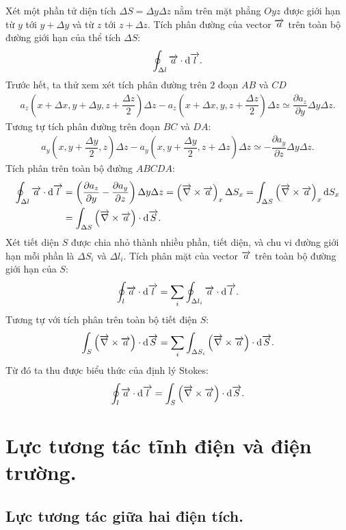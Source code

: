 \begin{appendices}
\begin{center}
\end{center}
Xét một phần tử diện tích $\Delta S= \Delta y \Delta z$ nằm trên mặt phẳng $Oyz$ được giới hạn từ $y$ tới $y+\Delta y$ và từ $z$ tới $z+\Delta z$. Tích phân đường của vector $\overrightarrow{a}$ trên toàn bộ đường giới hạn của thể tích $\Delta S$:
$$\oint_{\Delta l} \overrightarrow{a}\cdot\mathrm{d}\overrightarrow{l}.$$
Trước hết, ta thử xem xét tích phân đường trên $2$ đoạn  $AB$ và $CD$
\begin{align*}
	  a_z\left(x+\Delta x,y+\Delta y,z+\dfrac{\Delta z}{2}\right)\Delta z-a_z\left(x+\Delta x,y,z+\dfrac{\Delta z}{2}\right)\Delta z\simeq \dfrac{\partial a_z}{\partial y}\Delta y\Delta z.
\end{align*}
Tương tự tích phân đường trên đoạn $BC$ và $DA$:
\begin{align*}
	a_y\left(x,y+\dfrac{\Delta y}{2},z\right)\Delta z-a_y\left(x,y+\dfrac{\Delta y}{2},z+\Delta z\right)\Delta z\simeq -\dfrac{\partial a_y}{\partial z}\Delta y\Delta z.
\end{align*}
Tích phân trên toàn bộ đường $ABCDA$:
\begin{align*}
	\oint_{\Delta l} \overrightarrow{a}\cdot\mathrm{d}\overrightarrow{l}&=\left(\dfrac{\partial a_z}{\partial y}-\dfrac{\partial a_y}{\partial z}\right)\Delta y\Delta z=\left(\overrightarrow{\nabla}\times\overrightarrow{a}\right)_x\Delta S_x=\int_{\Delta S}\left(\overrightarrow{\nabla}\times\overrightarrow{a}\right)_x\mathrm{d} S_x\\
	&=\int_{\Delta S}\left(\overrightarrow{\nabla}\times\overrightarrow{a}\right)\cdot\mathrm{d} \overrightarrow{S}.
\end{align*}
Xét tiết diện $S$ được chia nhỏ thành nhiều phần, tiết diện, và chu vi đường giới hạn mỗi phần là $\Delta S_i$ và $\Delta l_i$. Tích phân mặt của vector $\overrightarrow{a}$ trên toàn bộ đường giới hạn của $S$:
$$\oint_{l}\overrightarrow{a}\cdot\mathrm{d}\overrightarrow{l}=\sum_i\oint_{\Delta l_i}\overrightarrow{a}\cdot\mathrm{d}\overrightarrow{l}.$$
Tương tự với tích phân trên toàn bộ tiết điện $S$:
$$\int_{S}\left(\overrightarrow{\nabla}\times\overrightarrow{a}\right)\cdot\mathrm{d} \overrightarrow{S}=\sum_i\int_{\Delta S_i}\left(\overrightarrow{\nabla}\times\overrightarrow{a}\right)\cdot\mathrm{d} \overrightarrow{S}.$$
Từ đó ta thu được biểu thức của định lý Stokes:
$$\oint_{l}\overrightarrow{a}\cdot\mathrm{d}\overrightarrow{l}=\int_{S}\left(\overrightarrow{\nabla}\times\overrightarrow{a}\right)\cdot\mathrm{d} \overrightarrow{S}.$$
\section{Lực tương tác tĩnh điện và điện trường.}
\subsection{Lực tương tác giữa hai điện tích.}
\begin{center}



\end{center}
\end{appendices}

